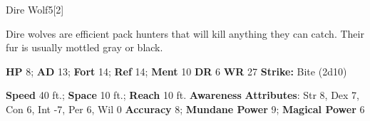   \begin{monsection}{Dire Wolf}{5}[2]
    \vspace{-1em}\vspace{-1em}
    \vspace{0em}

    
      Dire wolves are efficient pack hunters that will kill anything they can catch.
      Their fur is usually mottled gray or black.
    

    \begin{spellcontent}
      \begin{spelltargetinginfo}
        \pari \textbf{HP} 8;
          \textbf{AD} 13;
          \textbf{Fort} 14;
          \textbf{Ref} 14;
          \textbf{Ment} 10
        \pari \textbf{DR} 6
        \pari \textbf{WR} 27
        \pari \textbf{Strike:}
            Bite  (2d10)
      \end{spelltargetinginfo}
    \end{spellcontent}
    \begin{monsterfooter}
      \pari \textbf{Speed} 40 ft.;
        \textbf{Space} 10 ft.;
        \textbf{Reach} 10 ft.
      \pari \textbf{Awareness} 
      \pari \textbf{Attributes}:
        Str 8, Dex 7,
        Con 6, Int -7,
        Per 6, Wil 0
      \pari \textbf{Accuracy} 8;
        \textbf{Mundane Power} 9;
      \textbf{Magical Power} 6
    \end{monsterfooter}
  \end{monsection}
  
